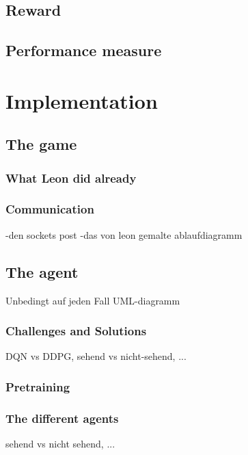\subsection{Reward}

\subsection{Performance measure}

\section{Implementation}

\subsection{The game}

\subsubsection{What Leon did already}

\subsubsection{Communication}

-den sockets post
-das von leon gemalte ablaufdiagramm

\subsection{The agent}

Unbedingt auf jeden Fall UML-diagramm

\subsubsection{Challenges and Solutions}

DQN vs DDPG, sehend vs nicht-sehend, ...

\subsubsection{Pretraining}

\subsubsection{The different agents}

sehend vs nicht sehend, ...

